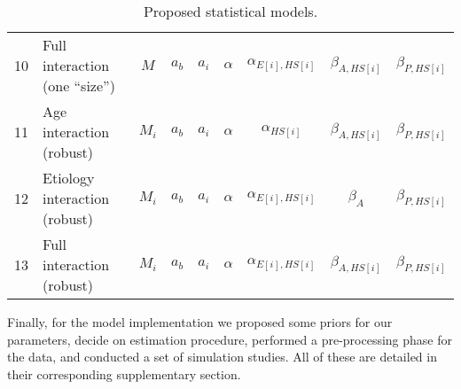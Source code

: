 \begin{table}[h!]
\begin{tabular}{|c|lccccccc|}
		10 & Full interaction (one ``size'') & $M$ & $a_{b}$ & $a_{i}$ & $\alpha$ & $\alpha_{E[i],HS[i]}$ & $\beta_{A, HS[i]}$ & $\beta_{P, HS[i]}$ \\
		\rowcolor{gray}
		11 & Age interaction (robust) & $M_{i}$ & $a_{b}$ & $a_{i}$ & $\alpha$ & $\alpha_{HS[i]}$ & $\beta_{A, HS[i]}$ & $\beta_{P, HS[i]}$ \\
		12 & Etiology interaction (robust) & $M_{i}$ & $a_{b}$ & $a_{i}$ & $\alpha$ & $\alpha_{E[i],HS[i]}$ & $\beta_{A}$ & $\beta_{P, HS[i]}$ \\
		\rowcolor{gray}
		13 & Full interaction (robust) & $M_{i}$ & $a_{b}$ & $a_{i}$ & $\alpha$ & $\alpha_{E[i],HS[i]}$ & $\beta_{A, HS[i]}$ & $\beta_{P, HS[i]}$ \\
		\hline
	\end{tabular}
	\caption[Proposed statistical models]{Proposed statistical models.}
	\label{tab:models}
\end{table}

Finally, for the model implementation we proposed some priors for our parameters, decide on estimation procedure, performed a pre-processing phase for the data, and conducted a set of simulation studies. All of these are detailed in their corresponding supplementary section.
%
%
